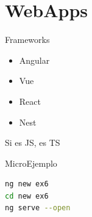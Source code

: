 \documentclass[aspectratio=169]{beamer}
\begin{document}
{
    \section{WebApps}
}


\begin{frame}[fragile]{Frameworks}
    \begin{itemize}
        \item Angular
        \item Vue
        \item React
        \item Nest
    \end{itemize}
    Si es JS, es TS
\end{frame}

\begin{frame}[fragile]{MicroEjemplo}
\begin{lstlisting}[language=bash]
ng new ex6
cd new ex6
ng serve --open
\end{lstlisting}
\end{frame}
\end{document}
